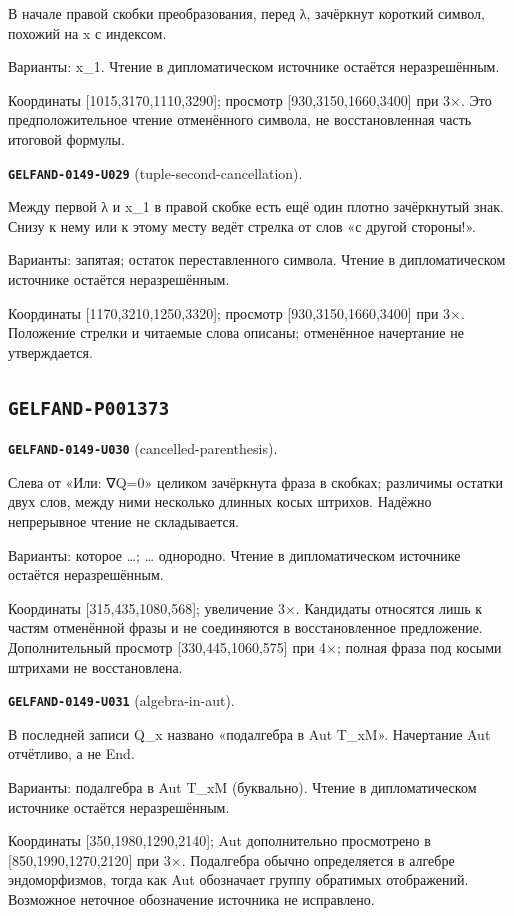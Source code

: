 \documentclass[11pt]{article}
\theoremstyle{definition}
\theoremstyle{remark}
\begin{document}
В начале правой скобки преобразования, перед λ, зачёркнут короткий символ, похожий на x с индексом.\par
Варианты: x\_1. Чтение в дипломатическом источнике остаётся неразрешённым.\par
Координаты [1015,3170,1110,3290]; просмотр [930,3150,1660,3400] при 3×. Это предположительное чтение отменённого символа, не восстановленная часть итоговой формулы.\par\medskip
\noindent\leavevmode{}\label{GELFAND-P001372:tuple-second-cancellation:note}\textbf{\texttt{GELFAND-0149-U029}} (tuple-second-cancellation).\par\nopagebreak[4]
Между первой λ и x\_1 в правой скобке есть ещё один плотно зачёркнутый знак. Снизу к нему или к этому месту ведёт стрелка от слов «с другой стороны!».\par
Варианты: запятая; остаток переставленного символа. Чтение в дипломатическом источнике остаётся неразрешённым.\par
Координаты [1170,3210,1250,3320]; просмотр [930,3150,1660,3400] при 3×. Положение стрелки и читаемые слова описаны; отменённое начертание не утверждается.\par\medskip

\subsection*{\texttt{GELFAND-P001373}}
\noindent\leavevmode{}\label{GELFAND-P001373:cancelled-parenthesis:note}\textbf{\texttt{GELFAND-0149-U030}} (cancelled-parenthesis).\par\nopagebreak[4]
Слева от «Или: ∇Q=0» целиком зачёркнута фраза в скобках; различимы остатки двух слов, между ними несколько длинных косых штрихов. Надёжно непрерывное чтение не складывается.\par
Варианты: которое …; … однородно. Чтение в дипломатическом источнике остаётся неразрешённым.\par
Координаты [315,435,1080,568]; увеличение 3×. Кандидаты относятся лишь к частям отменённой фразы и не соединяются в восстановленное предложение. Дополнительный просмотр [330,445,1060,575] при 4×; полная фраза под косыми штрихами не восстановлена.\par\medskip
\noindent\leavevmode{}\label{GELFAND-P001373:algebra-in-aut:note}\textbf{\texttt{GELFAND-0149-U031}} (algebra-in-aut).\par\nopagebreak[4]
В последней записи Q\_x названо «подалгебра в Aut T\_xM». Начертание Aut отчётливо, а не End.\par
Варианты: подалгебра в Aut T\_xM (буквально). Чтение в дипломатическом источнике остаётся неразрешённым.\par
Координаты [350,1980,1290,2140]; Aut дополнительно просмотрено в [850,1990,1270,2120] при 3×. Подалгебра обычно определяется в алгебре эндоморфизмов, тогда как Aut обозначает группу обратимых отображений. Возможное неточное обозначение источника не исправлено.\par\medskip
\end{document}
